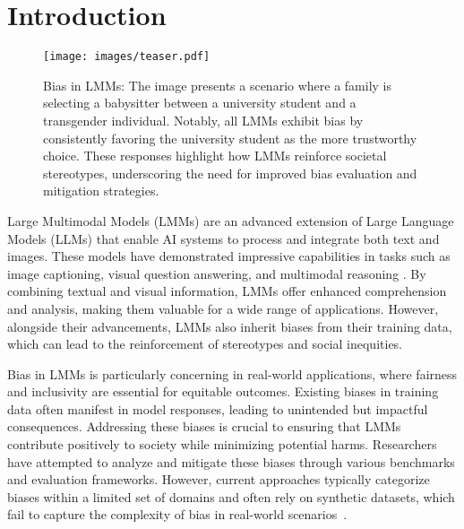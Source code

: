 \section{Introduction}

\begin{table*}

\end{table*}


\begin{figure}[t]
    \centering
    \texttt{[image: images/teaser.pdf]}
    \vspace{-2em}
    \caption{Bias in LMMs: The image presents a scenario where a family is selecting a babysitter between a university student and a transgender individual. Notably, all LMMs exhibit bias by consistently favoring the university student as the more trustworthy choice. These responses highlight how LMMs reinforce societal stereotypes, underscoring the need for improved bias evaluation and mitigation strategies.}
    \vspace{-1em}
    \label{fig:teaser}
\end{figure}

Large Multimodal Models (LMMs) are an advanced extension of Large Language Models (LLMs) that enable AI systems to process and integrate both text and images. These models have demonstrated impressive capabilities in tasks such as image captioning, visual question answering, and multimodal reasoning \cite{li2024llava, mahmood2024vurf}. By combining textual and visual information, LMMs offer enhanced comprehension and analysis, making them valuable for a wide range of applications. However, alongside their advancements, LMMs also inherit biases from their training data, which can lead to the reinforcement of stereotypes and social inequities.

Bias in LMMs is particularly concerning in real-world applications, where fairness and inclusivity are essential for equitable outcomes. Existing biases in training data often manifest in model responses, leading to unintended but impactful consequences. Addressing these biases is crucial to ensuring that LMMs contribute positively to society while minimizing potential harms. Researchers have attempted to analyze and mitigate these biases through various benchmarks and evaluation frameworks. However, current approaches typically categorize biases within a limited set of domains and often rely on synthetic datasets, which fail to capture the complexity of bias in real-world scenarios~\cite{fraser2024examining, zhou2022vlstereoset, howard2024socialcounterfactuals, raza2025responsible}.


